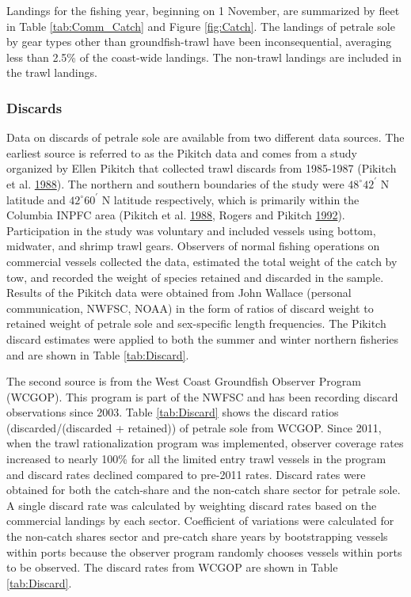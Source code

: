 \documentclass[12pt,]{article}
\begin{document}
Landings for the fishing year, beginning on 1 November, are summarized
by fleet in Table \ref{tab:Comm_Catch} and Figure \ref{fig:Catch}. The
landings of petrale sole by gear types other than groundfish-trawl have
been inconsequential, averaging less than 2.5\% of the coast-wide
landings. The non-trawl landings are included in the trawl landings.

\subsubsection{Discards}\label{discards}

Data on discards of petrale sole are available from two different data
sources. The earliest source is referred to as the Pikitch data and
comes from a study organized by Ellen Pikitch that collected trawl
discards from 1985-1987 (Pikitch et al.
\protect\hyperlink{ref-pikitch_evaluation_1988}{1988}). The northern and
southern boundaries of the study were \(48^\circ 42^\prime\) N latitude
and \(42^\circ 60^\prime\) N latitude respectively, which is primarily
within the Columbia INPFC area (Pikitch et al.
\protect\hyperlink{ref-pikitch_evaluation_1988}{1988}, Rogers and
Pikitch \protect\hyperlink{ref-rogers_numerical_1992}{1992}).
Participation in the study was voluntary and included vessels using
bottom, midwater, and shrimp trawl gears. Observers of normal fishing
operations on commercial vessels collected the data, estimated the total
weight of the catch by tow, and recorded the weight of species retained
and discarded in the sample. Results of the Pikitch data were obtained
from John Wallace (personal communication, NWFSC, NOAA) in the form of
ratios of discard weight to retained weight of petrale sole and
sex-specific length frequencies. The Pikitch discard estimates were
applied to both the summer and winter northern fisheries and are shown
in Table \ref{tab:Discard}.

The second source is from the West Coast Groundfish Observer Program
(WCGOP). This program is part of the NWFSC and has been recording
discard observations since 2003. Table \ref{tab:Discard} shows the
discard ratios (discarded/(discarded + retained)) of petrale sole from
WCGOP. Since 2011, when the trawl rationalization program was
implemented, observer coverage rates increased to nearly 100\% for all
the limited entry trawl vessels in the program and discard rates
declined compared to pre-2011 rates. Discard rates were obtained for
both the catch-share and the non-catch share sector for petrale sole. A
single discard rate was calculated by weighting discard rates based on
the commercial landings by each sector. Coefficient of variations were
calculated for the non-catch shares sector and pre-catch share years by
bootstrapping vessels within ports because the observer program randomly
chooses vessels within ports to be observed. The discard rates from
WCGOP are shown in Table \ref{tab:Discard}.
\end{document}
